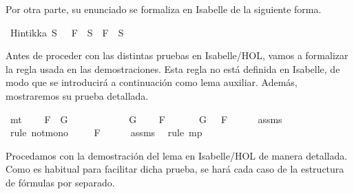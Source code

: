 \begin{isabellebody}
\begin{isamarkuptext}
  Por otra parte, su enunciado se formaliza en Isabelle de la siguiente 
  forma.%
\end{isamarkuptext}\isamarkuptrue%
\isamarkupfalse%
\ {\isachardoublequoteopen}Hintikka\ S\ {\isasymLongrightarrow}\ {\isacharparenleft}\isactrlbold {\isasymnot}\ F\ {\isasymin}\ S\ {\isasymlongrightarrow}\ F\ {\isasymnotin}\ S{\isacharparenright}{\isachardoublequoteclose}\isanewline
%
\isadelimproof
\ \ %
\endisadelimproof
%
\isatagproof
{}\isamarkupfalse%
%
\endisatagproof
{\isafoldproof}%
%
\isadelimproof
%
\endisadelimproof
%
\begin{isamarkuptext}%
Antes de proceder con las distintas pruebas en Isabelle/HOL, 
  vamos a formalizar la regla  usada en las 
  demostraciones. Esta regla no está definida en Isabelle, de modo que 
  se introducirá a continuación como lema auxiliar. Además, mostraremos
  su prueba detallada.%
\end{isamarkuptext}\isamarkuptrue%
\isamarkupfalse%
\ mt{\isacharcolon}\ \isanewline
\ \ \ {\isachardoublequoteopen}F\ {\isasymlongrightarrow}\ G{\isachardoublequoteclose}\ \isanewline
\ \ \ \ \ \ \ \ \ \ {\isachardoublequoteopen}{\isasymnot}\ G{\isachardoublequoteclose}\isanewline
\ \ \ {\isachardoublequoteopen}{\isasymnot}\ F{\isachardoublequoteclose}\isanewline
%
\isadelimproof
%
\endisadelimproof
%
\isatagproof
{}\isamarkupfalse%
\ {\isacharminus}\isanewline
\ \ \isamarkupfalse%
\ {\isachardoublequoteopen}{\isasymnot}\ G\ {\isasymlongrightarrow}\ {\isasymnot}\ F{\isachardoublequoteclose}\isanewline
\ \ \ \ \isamarkupfalse%
\ assms{\isacharparenleft}{}{\isacharparenright}\ \isamarkupfalse%
\ {\isacharparenleft}rule\ not{\isacharunderscore}mono{\isacharparenright}\isanewline
\ \ \isamarkupfalse%
\ {\isachardoublequoteopen}{\isasymnot}\ F{\isachardoublequoteclose}\isanewline
\ \ \ \ \isamarkupfalse%
\ assms{\isacharparenleft}{}{\isacharparenright}\ \isamarkupfalse%
\ {\isacharparenleft}rule\ mp{\isacharparenright}\isanewline
{}\isamarkupfalse%
%
\endisatagproof
{\isafoldproof}%
%
\isadelimproof
%
\endisadelimproof
%
\begin{isamarkuptext}%
Procedamos con la demostración del lema en Isabelle/HOL de
  manera detallada. Como es habitual para facilitar dicha prueba, se 
  hará cada caso de la estructura de fórmulas por separado.%
\end{isamarkuptext}\isamarkuptrue%

\end{isabellebody}
